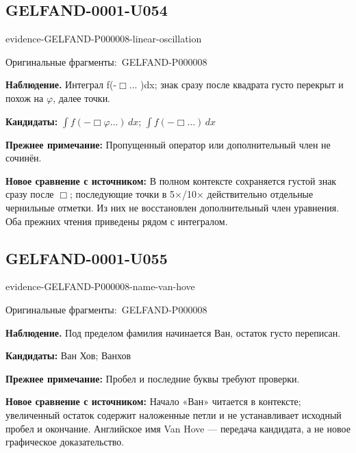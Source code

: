 \documentclass[11pt]{article}
\newcommand{\EvidenceBlock}[4]{%
 \par\smallskip\noindent\begin{minipage}{\linewidth}
 \begin{minipage}[t]{.47\linewidth}\vspace{0pt}\centering
 \csname evidence-#1-#2\endcsname\par
 {\scriptsize\SourceCropCaption\ #1}\par
 \end{minipage}\hfill
 \begin{minipage}[t]{.49\linewidth}\vspace{0pt}\raggedright
 {\small\color{orange!65!black}\textbf{#4} #3}\par
 \end{minipage}
 \end{minipage}\par\smallskip}
\newcommand{\SourceCropCaption}{Оригинальные фрагменты:}\newcommand{\ReadingCaption}{Сомнительное чтение.}\newcommand{\IncompleteCaption}{Неразобранный фрагмент.}\newcommand{\DiagramCaption}{Рисунок и набранное описание.}
\begin{document}
\subsection*{GELFAND-0001-U054}
\EvidenceBlock{GELFAND-P000008}{linear-oscillation}{Интеграл f(-\(\Box\)... )dx; знак сразу после квадрата густо перекрыт и похож на \(\varphi\), далее точки.}{Наблюдение.}
\par\smallskip\noindent\textbf{Кандидаты: } \(\int f(-\Box\varphi\ldots)\,dx\); \(\int f(-\Box\ldots)\,dx\)\par
\par\smallskip\noindent\textbf{Прежнее примечание: } Пропущенный оператор или дополнительный член не сочинён.\par
\par\smallskip\noindent\textbf{Новое сравнение с источником: } В полном контексте сохраняется густой знак сразу после \(\Box\); последующие точки в 5×/10× действительно отдельные чернильные отметки. Из них не восстановлен дополнительный член уравнения. Оба прежних чтения приведены рядом с интегралом.\par

\subsection*{GELFAND-0001-U055}
\EvidenceBlock{GELFAND-P000008}{name-van-hove}{Под пределом фамилия начинается Ван, остаток густо переписан.}{Наблюдение.}
\par\smallskip\noindent\textbf{Кандидаты: } Ван Хов; Ванхов\par
\par\smallskip\noindent\textbf{Прежнее примечание: } Пробел и последние буквы требуют проверки.\par
\par\smallskip\noindent\textbf{Новое сравнение с источником: } Начало «Ван» читается в контексте; увеличенный остаток содержит наложенные петли и не устанавливает исходный пробел и окончание. Английское имя Van Hove — передача кандидата, а не новое графическое доказательство.\par
\end{document}
